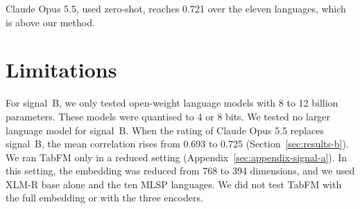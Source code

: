 \documentclass[11pt]{article}
\begin{document}

Claude Opus 5.5, used zero-shot, reaches 0.721 over the eleven languages, which is above our %
method.


\section*{Limitations}
For signal~B, we only tested open-weight language models with 8 to 12 billion parameters. These %
models were quantised to 4 or 8 bits. We tested no larger language model for signal~B. When the %
rating of Claude Opus 5.5 replaces signal~B, the mean correlation rises from 0.693 to 0.725 %
(Section~\ref{sec:results-b}). We ran TabFM only in a reduced setting
(Appendix~\ref{sec:appendix-signal-a}).
In this setting, the embedding was reduced from 768 to 394 dimensions, and we used XLM-R base alone %
and the ten MLSP languages. We did not test TabFM with the full embedding or with the three encoders.
\end{document}
